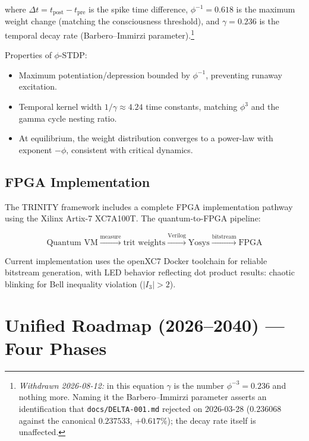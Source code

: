 \documentclass[12pt,a4paper]{article}
\begin{document}
\noindent
where $\Delta t = t_{\mathrm{post}} - t_{\mathrm{pre}}$ is the spike time
difference, $\phi^{-1} = 0.618$ is the maximum weight change (matching the
consciousness threshold), and $\gamma = 0.236$ is the temporal decay rate
(Barbero--Immirzi parameter).\footnote{\emph{Withdrawn 2026-08-12:} in this
equation $\gamma$ is the number $\phi^{-3} = 0.236$ and nothing more. Naming it
the Barbero--Immirzi parameter asserts an identification that
\texttt{docs/DELTA-001.md} rejected on 2026-03-28 ($0.236068$ against the
canonical $0.237533$, $+0.617\%$); the decay rate itself is unaffected.}

Properties of $\phi$-STDP:
\begin{itemize}[leftmargin=2em]
  \item Maximum potentiation/depression bounded by $\phi^{-1}$, preventing
    runaway excitation.
  \item Temporal kernel width $1/\gamma \approx 4.24$ time constants, matching
    $\phi^3$ and the gamma cycle nesting ratio.
  \item At equilibrium, the weight distribution converges to a power-law with
    exponent $-\phi$, consistent with critical dynamics.
\end{itemize}

\subsection{FPGA Implementation}

The TRINITY framework includes a complete FPGA implementation pathway using
the Xilinx Artix-7 XC7A100T. The quantum-to-FPGA pipeline:

\begin{equation}
\text{Quantum VM} \xrightarrow{\text{measure}} \text{trit weights}
\xrightarrow{\text{Verilog}} \text{Yosys} \xrightarrow{\text{bitstream}}
\text{FPGA}
\end{equation}

\noindent
Current implementation uses the openXC7 Docker toolchain for reliable
bitstream generation, with LED behavior reflecting dot product results:
chaotic blinking for Bell inequality violation ($|I_3| > 2$).

\section{Unified Roadmap (2026--2040) --- Four Phases}
\label{sec:roadmap}
\end{document}
